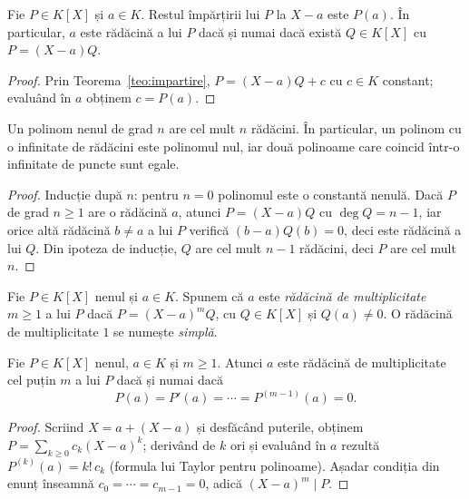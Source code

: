 \begin{teorema}\label{teo:factor}
Fie $P \in K[X]$ și $a \in K$. Restul împărțirii lui $P$ la $X-a$ este $P(a)$. În particular, $a$ este rădăcină a lui $P$ dacă și numai dacă există $Q \in K[X]$ cu $P = (X - a)Q$.
\end{teorema}

\begin{proof}
Prin Teorema~\ref{teo:impartire}, $P = (X-a)Q + c$ cu $c\in K$ constant; evaluând în $a$ obținem $c = P(a)$.
\end{proof}

\begin{corolar}\label{cor:nrradacini}
Un polinom nenul de grad $n$ are cel mult $n$ rădăcini. În particular, un polinom cu o infinitate de rădăcini este polinomul nul, iar două polinoame care coincid într-o infinitate de puncte sunt egale.
\end{corolar}

\begin{proof}
Inducție după $n$: pentru $n = 0$ polinomul este o constantă nenulă. Dacă $P$ de grad $n\ge 1$ are o rădăcină $a$, atunci $P = (X - a)Q$ cu $\deg Q = n - 1$, iar orice altă rădăcină $b\neq a$ a lui $P$ verifică $(b-a)Q(b)=0$, deci este rădăcină a lui $Q$. Din ipoteza de inducție, $Q$ are cel mult $n-1$ rădăcini, deci $P$ are cel mult $n$.
\end{proof}

\begin{definitie}
Fie $P \in K[X]$ nenul și $a \in K$. Spunem că $a$ este \emph{rădăcină de multiplicitate $m \ge 1$} a lui $P$ dacă $P = (X - a)^m Q$, cu $Q \in K[X]$ și $Q(a) \neq 0$. O rădăcină de multiplicitate $1$ se numește \emph{simplă}.
\end{definitie}

\begin{propozitie}\label{prop:multiplicitate}
Fie $P \in K[X]$ nenul, $a \in K$ și $m \ge 1$. Atunci $a$ este rădăcină de multiplicitate cel puțin $m$ a lui $P$ dacă și numai dacă
\[
P(a) = P'(a) = \cdots = P^{(m-1)}(a) = 0 .
\]
\end{propozitie}

\begin{proof}
Scriind $X = a + (X-a)$ și desfăcând puterile, obținem $P = \sum_{k\ge 0} c_k (X-a)^k$; derivând de $k$ ori și evaluând în $a$ rezultă $P^{(k)}(a) = k!\,c_k$ (formula lui Taylor pentru polinoame). Așadar condiția din enunț înseamnă $c_0 = \cdots = c_{m-1} = 0$, adică $(X-a)^m \mid P$.
\end{proof}

